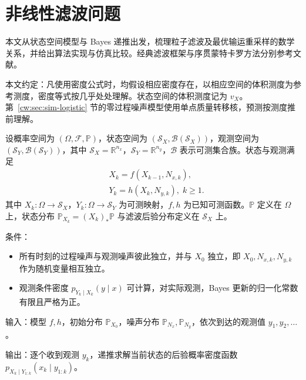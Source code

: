 \section{非线性滤波问题}\label{cw:sec:model}

本文从状态空间模型与 Bayes 递推出发，梳理粒子滤波及最优输运重采样的数学关系，并给出算法实现与仿真比较。经典滤波框架与序贯蒙特卡罗方法分别参考文献\cite{bar2001estimation,doucet2001sequential}。

本文约定：凡使用密度公式时，均假设相应密度存在，以相应空间的体积测度为参考测度，密度等式按几乎处处理解。状态空间的体积测度记为 $v_X$。第~\ref{cw:sec:sim-logistic} 节的零过程噪声模型使用单点质量转移核，预测按测度推前理解。

设概率空间为 $(\Omega,\mathcal{F},\mathbb{P})$，状态空间为 $(\mathcal{S}_X,\mathcal{B}(\mathcal{S}_X))$，观测空间为 $(\mathcal{S}_Y,\mathcal{B}(\mathcal{S}_Y))$，其中 $\mathcal{S}_X=\mathbb{R}^{n_x}$，$\mathcal{S}_Y=\mathbb{R}^{n_y}$，$\mathcal{B}$ 表示可测集合族。状态与观测满足
\begin{equation}\label{cw:eq:1}
\begin{aligned}
&X_k=f(X_{k-1},N_{x,k}),\\
&Y_k=h(X_k,N_{y,k}),\;k\geq1.
\end{aligned}
\end{equation}
其中 $X_k:\Omega\to\mathcal{S}_X$，$Y_k:\Omega\to\mathcal{S}_Y$ 为可测映射，$f,h$ 为已知可测函数。$\mathbb{P}$ 定义在 $\Omega$ 上，状态分布 $\mathbb{P}_{X_k}=(X_k)_*\mathbb{P}$ 与滤波后验分布定义在 $\mathcal{S}_X$ 上。

条件：
\begin{itemize}
\item 所有时刻的过程噪声与观测噪声彼此独立，并与 $X_0$ 独立，即 $X_0, N_{x,k}, N_{y,k}$ 作为随机变量相互独立。
\item 观测条件密度 $p_{Y_k\mid X_k}(y \mid x)$ 可计算，对实际观测，Bayes 更新的归一化常数有限且严格为正。
\end{itemize}

输入：模型 $f,h$，初始分布 $\mathbb{P}_{X_0}$，噪声分布 $\mathbb{P}_{N_x},\mathbb{P}_{N_y}$，依次到达的观测值 $y_1,y_2,\dots$。

输出：逐个收到观测 $y_k$，递推求解当前状态的后验概率密度函数 $p_{X_k\mid Y_{1:k}}(x_k \mid y_{1:k})$。

